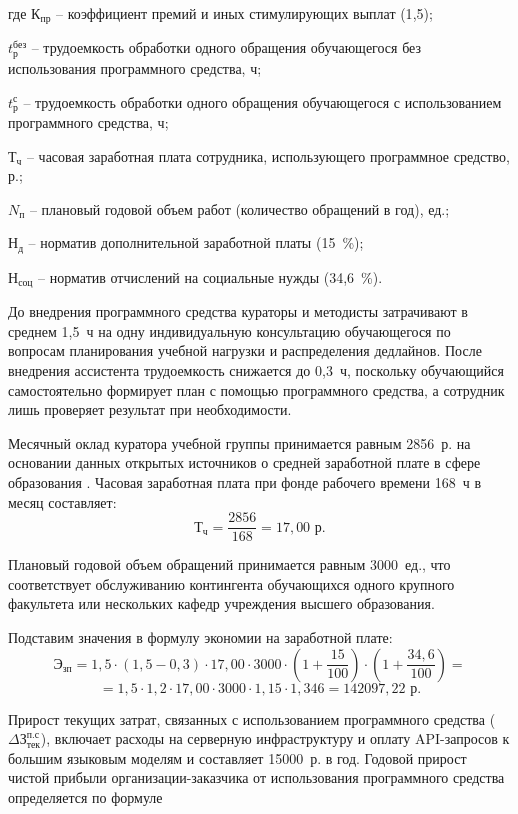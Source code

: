 где $\text{К}_{\text{пр}}$ -- коэффициент премий и иных стимулирующих выплат (1{,}5);

    $t_{\text{р}}^{\text{без}}$ -- трудоемкость обработки одного обращения обучающегося без использования программного средства, ч;

    $t_{\text{р}}^{\text{с}}$ -- трудоемкость обработки одного обращения обучающегося с использованием программного средства, ч;

    $\text{Т}_{\text{ч}}$ -- часовая заработная плата сотрудника, использующего программное средство, р.;

    $N_{\text{п}}$ -- плановый годовой объем работ (количество обращений в год), ед.;

    $\text{Н}_{\text{д}}$ -- норматив дополнительной заработной платы (15~\%);

    $\text{Н}_{\text{соц}}$ -- норматив отчислений на социальные нужды (34{,}6~\%).

До внедрения программного средства кураторы и методисты затрачивают в среднем 1{,}5~ч на одну индивидуальную консультацию обучающегося по вопросам планирования учебной нагрузки и распределения дедлайнов. После внедрения ассистента трудоемкость снижается до 0{,}3~ч, поскольку обучающийся самостоятельно формирует план с помощью программного средства, а сотрудник лишь проверяет результат при необходимости.

Месячный оклад куратора учебной группы принимается равным 2856~р. на основании данных открытых источников о средней заработной плате в сфере образования \cite{WorldSalariesAnalyst2026}. Часовая заработная плата при фонде рабочего времени 168~ч в месяц составляет:
$$
    \text{Т}_{\text{ч}} = \frac{2856}{168} = 17{,}00 \text{ р}.
$$

Плановый годовой объем обращений принимается равным 3000~ед., что соответствует обслуживанию контингента обучающихся одного крупного факультета или нескольких кафедр учреждения высшего образования.

Подставим значения в формулу экономии на заработной плате:
$$
    \text{Э}_{\text{зп}} = 1{,}5 \cdot (1{,}5 - 0{,}3) \cdot 17{,}00 \cdot 3000 \cdot \left(1 + \frac{15}{100}\right) \cdot \left(1 + \frac{34{,}6}{100}\right) =
$$
$$
    = 1{,}5 \cdot 1{,}2 \cdot 17{,}00 \cdot 3000 \cdot 1{,}15 \cdot 1{,}346 = 142097{,}22 \text{ р}.
$$

Прирост текущих затрат, связанных с использованием программного средства ($\Delta\text{З}_{\text{тек}}^{\text{п.с}}$), включает расходы на серверную инфраструктуру и оплату API-запросов к большим языковым моделям и составляет 15000~р. в год.
Годовой прирост чистой прибыли организации-заказчика от использования программного средства определяется по формуле

